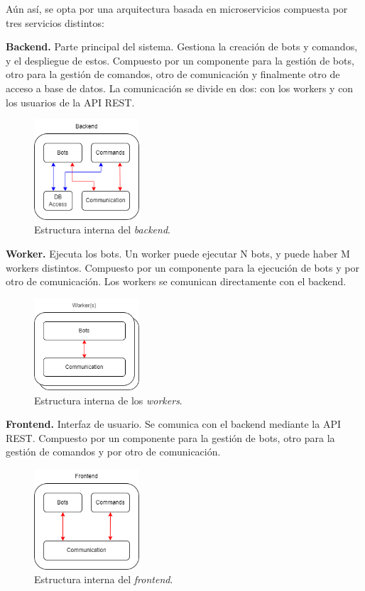Aún así, se opta por una arquitectura basada en microservicios compuesta por tres servicios distintos:

\textbf{Backend.} Parte principal del sistema. Gestiona la creación de bots y comandos, y el despliegue de estos. Compuesto por un componente para la gestión de bots, otro para la gestión de comandos, otro de comunicación y finalmente otro de acceso a base de datos. La comunicación se divide en dos: con los workers y con los usuarios de la API REST.

\begin{figure}[H]
	\centering
	\includegraphics[width=0.35\textwidth]{img/backend_internals.png}
	\caption{Estructura interna del \textit{backend}.}
\end{figure}

\textbf{Worker.} Ejecuta los bots. Un worker puede ejecutar N bots, y puede haber M workers distintos. Compuesto por un componente para la ejecución de bots y por otro de comunicación. Los workers se comunican directamente con el backend.

\begin{figure}[H]
	\centering
	\includegraphics[width=0.35\textwidth]{img/worker_internals.png}
	\caption{Estructura interna de los \textit{workers}.}
\end{figure}


\textbf{Frontend.} Interfaz de usuario. Se comunica con el backend mediante la API REST. Compuesto por un componente para la gestión de bots, otro para la gestión de comandos y por otro de comunicación.

\begin{figure}[H]
	\centering
	\includegraphics[width=0.35\textwidth]{img/frontend_internals.png}
	\caption{Estructura interna del \textit{frontend}.}
\end{figure}

